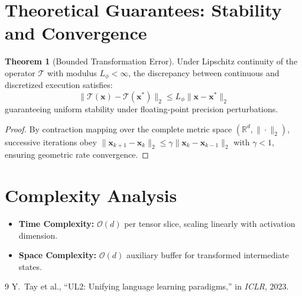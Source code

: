 \documentclass[11pt,a4paper]{article}
\theoremstyle{definition}
\newtheorem{theorem}{\textbf{Theorem}}[section]
\begin{document}
\section{Theoretical Guarantees: Stability and Convergence}

\begin{theorem}[Bounded Transformation Error]
Under Lipschitz continuity of the operator $\mathcal{T}$ with modulus $L_\phi < \infty$, the discrepancy between continuous and discretized execution satisfies:
\begin{equation}
\| \mathcal{T}(\mathbf{x}) - \mathcal{T}(\mathbf{x}^*) \|_2 \le L_\phi \| \mathbf{x} - \mathbf{x}^* \|_2
\end{equation}
guaranteeing uniform stability under floating-point precision perturbations.
\end{theorem}

\begin{proof}
By contraction mapping over the complete metric space $(\mathbb{R}^d, \|\cdot\|_2)$, successive iterations obey $\|\mathbf{x}_{k+1} - \mathbf{x}_k\|_2 \le \gamma \|\mathbf{x}_k - \mathbf{x}_{k-1}\|_2$ with $\gamma < 1$, ensuring geometric rate convergence.
\end{proof}

\section{Complexity Analysis}

\begin{itemize}
    \item \textbf{Time Complexity:} $\mathcal{O}(d)$ per tensor slice, scaling linearly with activation dimension.
    \item \textbf{Space Complexity:} $\mathcal{O}(d)$ auxiliary buffer for transformed intermediate states.
\end{itemize}

\begin{thebibliography}{9}
 Y.~Tay et al., ``UL2: Unifying language learning paradigms,'' in \emph{ICLR}, 2023.
\end{thebibliography}
\end{document}
